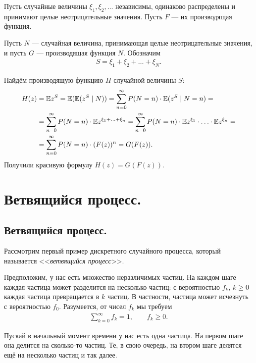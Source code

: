\documentclass[../main.tex]{subfiles}
\begin{document}
\begin{exmpl}
 \label{example:genfun_of_random_number_of_random_values}
 Пусть случайные величины $ \xi_1, \xi_2, \ldots $  независимы, одинаково распределены и принимают целые неотрицательные значения. Пусть $ F $ --- их производящая функция.

 Пусть  $ N $  --- случайная величина, принимающая целые неотрицательные значения, и пусть $ G $  --- производящая функция $ N $. Обозначим
 \begin{align*}
  S = \xi_1 + \xi_2 + \ldots + \xi_N.
 \end{align*}

 Найдём производящую функцию $ H $ случайной величины $ S $:
 \begin{align*}
  H(z) &= \mathbb E z^{S} = \mathbb E(\mathbb E(z^{S} \mid N)) = \sum_{n=0}^{\infty} P(N=n) \cdot \mathbb E(z^{S} \mid N = n) = \\
  &= \sum_{n=0}^{\infty}P(N=n) \cdot \mathbb E z^{\xi_1+\ldots+\xi_n} = \sum_{n=0}^{\infty} P(N=n) \cdot \mathbb E z^{\xi_1} \cdot \ldots \cdot \mathbb E z^{\xi_n} = \\
  &= \sum_{n=0}^{\infty} P(N=n) \cdot (F(z))^{n} = G(F(z)).
 \end{align*} Получили красивую формулу $ H(z) = G(F(z)) $.
\end{exmpl}

\newpage
\section{Ветвящийся процесс.}

\subsection{Ветвящийся процесс.}

Рассмотрим первый пример дискретного случайного процесса, который называется <<\textit{ветвящийся процесс}>>.

Предположим, у нас есть множество неразличимых частиц. На каждом шаге каждая частица может разделится на несколько частиц: с вероятностью $ f_k $,  $ k \geqslant 0 $ каждая частица превращается в $ k $  частиц.  В частности, частица может исчезнуть с вероятностью $ f_0 $. Разумеется, от чисел $ f_k $ мы требуем
\begin{align*}
 \sum_{k=0}^{\infty}f_k = 1, \qquad f_k \geqslant 0.
\end{align*}

Пускай в начальный момент времени у нас есть одна частица. На первом шаге она делится на сколько-то частиц. Те, в свою очередь, на втором шаге делятся ещё на несколько частиц и так далее.
\end{document}

